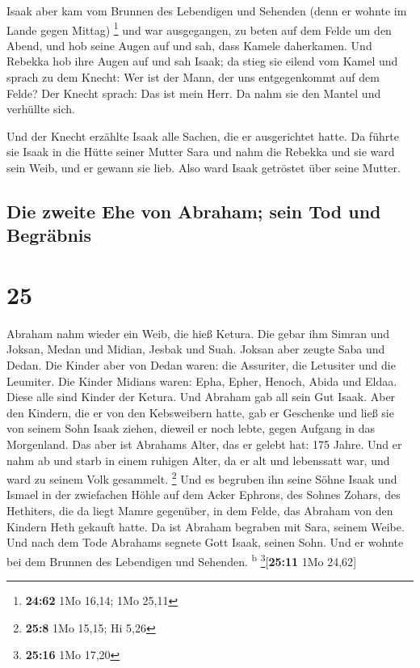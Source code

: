  Isaak aber kam vom Brunnen des Lebendigen und Sehenden
(denn er wohnte im Lande gegen Mittag) \footnote{\textbf{24:62} 1Mo
  16,14; 1Mo 25,11}  und war ausgegangen, zu beten auf
dem Felde um den Abend, und hob seine Augen auf und sah, dass Kamele
daherkamen.  Und Rebekka hob ihre Augen auf und sah
Isaak; da stieg sie eilend vom Kamel  und sprach zu dem
Knecht: Wer ist der Mann, der uns entgegenkommt auf dem Felde? Der
Knecht sprach: Das ist mein Herr. Da nahm sie den Mantel und verhüllte
sich.

 Und der Knecht erzählte Isaak alle Sachen, die er
ausgerichtet hatte.  Da führte sie Isaak in die Hütte
seiner Mutter Sara und nahm die Rebekka und sie ward sein Weib, und er
gewann sie lieb. Also ward Isaak getröstet über seine Mutter.

\hypertarget{die-zweite-ehe-von-abraham-sein-tod-und-begruxe4bnis}{%
\subsection{Die zweite Ehe von Abraham; sein Tod und
Begräbnis}\label{die-zweite-ehe-von-abraham-sein-tod-und-begruxe4bnis}}

\hypertarget{section-24}{%
\section{25}\label{section-24}}

 Abraham nahm wieder ein Weib, die hieß Ketura.
 Die gebar ihm Simran und Joksan, Medan und Midian, Jesbak
und Suah.  Joksan aber zeugte Saba und Dedan. Die Kinder
aber von Dedan waren: die Assuriter, die Letusiter und die Leumiter.
 Die Kinder Midians waren: Epha, Epher, Henoch, Abida und
Eldaa. Diese alle sind Kinder der Ketura.  Und Abraham gab
all sein Gut Isaak.  Aber den Kindern, die er von den
Kebsweibern hatte, gab er Geschenke und ließ sie von seinem Sohn Isaak
ziehen, dieweil er noch lebte, gegen Aufgang in das Morgenland.
 Das aber ist Abrahams Alter, das er gelebt hat: 175
Jahre.  Und er nahm ab und starb in einem ruhigen Alter,
da er alt und lebenssatt war, und ward zu seinem Volk gesammelt.
\footnote{\textbf{25:8} 1Mo 15,15; Hi 5,26}  Und es
begruben ihn seine Söhne Isaak und Ismael in der zwiefachen Höhle auf
dem Acker Ephrons, des Sohnes Zohars, des Hethiters, die da liegt Mamre
gegenüber,  in dem Felde, das Abraham von den Kindern
Heth gekauft hatte. Da ist Abraham begraben mit Sara, seinem Weibe.
 Und nach dem Tode Abrahams segnete Gott Isaak, seinen
Sohn. Und er wohnte bei dem Brunnen des Lebendigen und Sehenden.
\textsuperscript{b} \footnote{\textbf{25:16} 1Mo 17,20}{[}\textbf{25:11}
1Mo 24,62{]}

